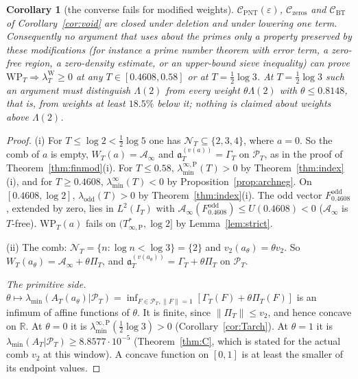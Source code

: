 \documentclass[11pt]{amsart}
\newtheorem{corollary}[theorem]{Corollary}
\theoremstyle{definition}
\theoremstyle{remark}
\newcommand{\R}{\mathbb R}
\newcommand{\PT}{\mathcal P_T}
\newcommand{\IT}{I_T}
\newcommand{\lamW}{\lambda^{\mathrm W}_T}
\newcommand{\lamA}{\lambda_{\min}(A_T|\PT)}
\newcommand{\NT}{\mathcal N_T}
\newcommand{\Ainf}{\mathcal A_\infty}
\newcommand{\PiT}{\Pi_T}
\newcommand{\laminf}{\lambda^{\infty}_{\min}}
\newcommand{\laminfP}{\lambda^{\infty,\mathrm P}_{\min}}
\begin{document}
\begin{corollary}[the converse fails for modified weights]
$\mathcal C_{\mathrm{PNT}}(\varepsilon)$, $\mathcal C_{\mathrm{zeros}}$ and $\mathcal C_{\mathrm{BT}}$ of
Corollary~\ref{cor:void} are closed under deletion and under lowering one term. Consequently no argument
that uses about the primes only a property preserved by these modifications (for instance a prime number
theorem with error term, a zero-free region, a zero-density estimate, or an upper-bound sieve inequality)
can prove $\mathrm{WP}_T\Rightarrow\lamW\ge0$ at any $T\in[0.4608,0.58]$ or at $T=\frac12\log3$. At $T=\frac12\log3$
such an argument must distinguish $\Lambda(2)$ from every weight $\theta\Lambda(2)$ with $\theta\le0.8148$, that is,
from weights at least $18.5\%$ below it; nothing is claimed about weights above $\Lambda(2)$.
\end{corollary}
\begin{proof}
(i) For $T\le\log2<\frac12\log5$ one has $\NT\subseteq\{2,3,4\}$, where $a=0$. So the comb of $a$ is empty,
$W_T(a)=\Ainf$ and $\mathfrak a^{(v(a))}_T=\Gamma_T$ on $\PT$, as in the proof of Theorem~\ref{thm:finmod}(i). For
$T\le0.58$, $\laminfP(T)>0$ by Theorem~\ref{thm:index}(i), and for $T\ge0.4608$, $\laminf(T)<0$ by
Proposition~\ref{prop:archneg}. On $[0.4608,\log2]$, $\lambda_{\mathrm{odd}}(T)>0$ by Theorem~\ref{thm:index}(i). The
odd vector $F^{\mathrm{odd}}_{0.4608}$, extended by zero, lies in $L^2(\IT)$ with
$\Ainf(F^{\mathrm{odd}}_{0.4608})\le U(0.4608)<0$ ($\Ainf$ is $T$-free). $\mathrm{WP}_T(a)$ fails on
$(T^*_{\infty,\mathrm P},\log2]$ by Lemma~\ref{lem:strict}.

(ii) The comb: $\NT=\{n:\log n<\log3\}=\{2\}$ and $v_2(a_\theta)=\theta v_2$. So
$W_T(a_\theta)=\Ainf+\theta\PiT$, and $\mathfrak a^{(v(a_\theta))}_T=\Gamma_T+\theta\PiT$ on $\PT$.

\emph{The primitive side.} $\theta\mapsto\lambda_{\min}(A_T(a_\theta)|\PT)=\inf_{F\in\PT,\|F\|=1}[\Gamma_T(F)+\theta\PiT(F)]$
is an infimum of affine functions of $\theta$. It is finite, since $\|\PiT\|\le v_2$, and hence concave on
$\R$. At $\theta=0$ it is $\laminfP(\frac12\log3)>0$ (Corollary~\ref{cor:Tarch}). At $\theta=1$ it is
$\lamA\ge8.8577\cdot10^{-5}$ (Theorem~\ref{thm:C}, which is stated for the actual comb $v_2$ at this window). A
concave function on $[0,1]$ is at least the smaller of its endpoint values.


\end{proof}
\end{document}
